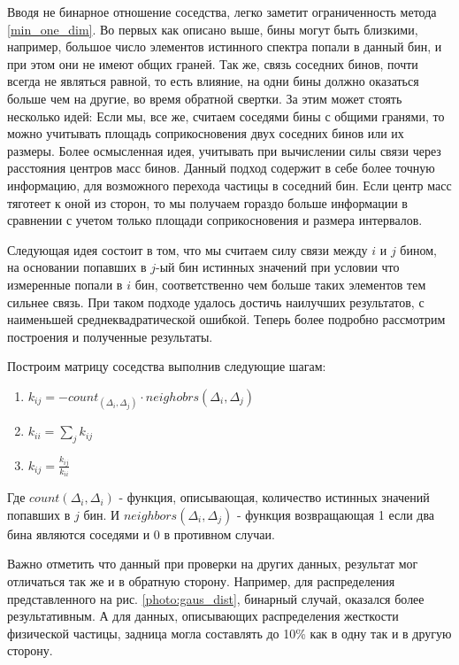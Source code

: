 \documentclass[a4paper,12pt]{diplom}
\begin{document}
Вводя не бинарное отношение соседства, легко заметит ограниченность метода \eqref{min_one_dim}. Во первых как описано выше, бины могут 
быть близкими, например, большое число элементов истинного спектра попали в данный бин, и при этом они не имеют общих граней. Так же, 
связь соседних бинов, почти всегда не являться равной, то есть влияние, на одни бины должно оказаться больше чем на другие, во время 
обратной свертки. За этим может стоять несколько идей: Если мы, все же, считаем соседями бины с общими гранями, то можно учитывать 
площадь соприкосновения двух соседних бинов или их размеры. Более осмысленная идея, учитывать при вычислении силы связи через расстояния 
центров масс бинов. Данный подход содержит в себе более точную информацию, для возможного перехода частицы в соседний бин. Если центр масс 
тяготеет к оной из сторон, то мы получаем гораздо больше информации в сравнении с учетом только площади соприкосновения и размера интервалов. 

Следующая идея состоит в том, что мы считаем силу связи между $i$ и $j$ бином, на основании попавших в $j$-ый бин истинных значений при условии
что измеренные попали в $i$ бин, соответственно чем больше таких элементов тем сильнее связь. При таком подходе удалось достичь наилучших 
результатов, с наименьшей среднеквадратической ошибкой. Теперь более подробно рассмотрим построения и полученные результаты.

Построим матрицу соседства выполнив следующие шагам:

\begin{enumerate}
   \item  $k_{ij} = - count_(\Delta_{i}, \Delta_{j}) \cdot neighobrs(\Delta_{i}, \Delta_{j})$ \\

   \item  $k_{ii} = \displaystyle\sum_{j} k_{ij}$ \\

   \item  $k_{ij} = \frac{k_{ij}}{k_{ii}}$

\end{enumerate}

Где $count(\Delta_{i}, \Delta_{i})$ - функция, описывающая, количество истинных значений попавших в $j$ бин. 
И $neighbors(\Delta_{i}, \Delta_{j})$ - функция возвращающая 1 если два бина являются соседями и 0 в противном случаи.

Важно отметить что данный при проверки на других данных, результат мог отличаться так же и в обратную сторону. Например, для распределения
представленного на рис. \ref{photo:gaus_dist}, бинарный случай, оказался более результативным. А для данных, описывающих распределения жесткости
физической частицы, задница могла составлять до 10\% как в одну так и в другую сторону.
\end{document}
